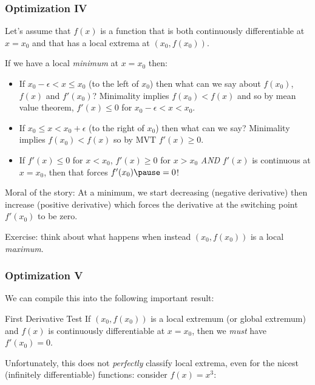 \documentclass{ltx-talk}
\begin{document}
\begin{frame}
  \frametitle{Optimization IV}
  Let's assume that $f(x)$ is a function that is both continuously differentiable at $x = x_0$ and that has a local extrema at $(x_0, f(x_0))$.

  If we have a local \textit{minimum} at $x = x_0$ then:
  \begin{itemize}
    \item If $x_0 - \epsilon < x \leq x_0$ (to the left of $x_0$) then what can we say about $f(x_0)$, $f(x)$ and $f'(x_0)$? \pause Minimality implies $f(x_0) < f(x)$ and so \pause
      by mean value theorem, $f'(x) \leq 0$ for $x_0 - \epsilon < x < x_0$. \pause 
    \item If $x_0 \leq x < x_0 + \epsilon$ (to the right of $x_0$) then what can we say? \pause Minimality implies $f(x_0) < f(x)$ so by MVT $f'(x) \geq 0$. \pause
    \item If $f'(x) \leq 0$ for $x < x_0$, $f'(x) \geq 0$ for $x > x_0$ \textit{AND} $f'(x)$ is continuous at $x = x_0$, then that forces $f'(x_0) \pause = 0$!
  \end{itemize} \pause

  Moral of the story: At a minimum, we start decreasing (negative derivative) then increase (positive derivative) \pause which forces the derivative at the switching point $f'(x_0)$ to be zero.

  Exercise: think about what happens when instead $(x_0, f(x_0))$ is a local \textit{maximum}.
\end{frame}

\begin{frame}
  \frametitle{Optimization V}

  We can compile this into the following important result:

  \begin{alertblock}{First Derivative Test}
    If $(x_0, f(x_0))$ is a local extremum (or global extremum) \pause
    and $f(x)$ is continuously differentiable at $x = x_0$, \pause
    then we \textit{must} have $f'(x_0) = 0$.
  \end{alertblock} \pause

  Unfortunately, this does not \textit{perfectly} classify local extrema, even for the nicest (infinitely differentiable) functions: consider $f(x) = x^3$:

  \vfill
\end{frame}
\end{document}
